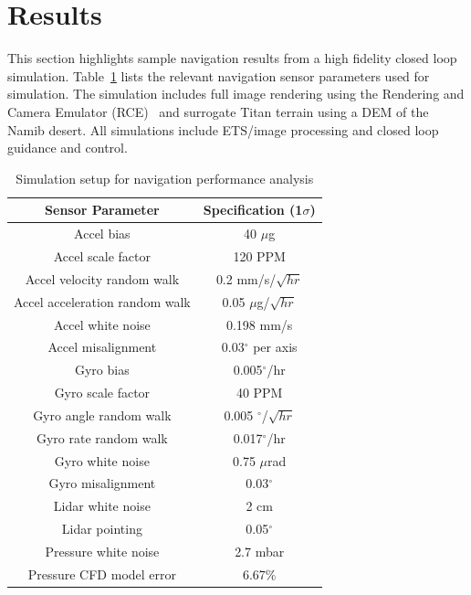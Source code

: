 \section{Results} \label{results}

This section highlights sample navigation results from a high fidelity closed loop simulation. Table~\ref{tab:sim_setup} lists the relevant navigation sensor parameters used for simulation. The simulation includes full image rendering using the Rendering and Camera Emulator (RCE)~\cite{rce} and surrogate Titan terrain using a DEM of the Namib desert.\cite{schilling2019} All simulations include ETS/image processing and closed loop guidance and control.  

\begin{table}[htbp]
	\fontsize{10}{10}\selectfont
    \caption{Simulation setup for navigation performance analysis}
   \label{tab:sim_setup}
        \centering 
   \begin{tabular}{| c | c |} %
      \hline 
      Sensor Parameter & Specification (1$\sigma$)  \\
      \hline 
        Accel bias & 40 $\mu$g \\
        Accel scale factor & 120 PPM \\
        Accel velocity random walk & 0.2 mm/s/$\sqrt{hr}$ \\
        Accel acceleration random walk & 0.05 $\mu$g/$\sqrt{hr}$ \\
        Accel white noise & 0.198 mm/s  \\
        Accel misalignment & 0.03$^\circ$ per axis \\
        Gyro bias & 0.005$^\circ$/hr  \\
        Gyro scale factor & 40 PPM  \\
        Gyro angle random walk & 0.005 $^\circ$/$\sqrt{hr}$  \\
        Gyro rate random walk & 0.017$^\circ$/hr  \\
        Gyro white noise & 0.75 $\mu$rad  \\
        Gyro misalignment & 0.03$^\circ$  \\
        Lidar white noise & 2 cm  \\
        Lidar pointing & 0.05$^\circ$  \\
        Pressure white noise & 2.7 mbar  \\
        Pressure CFD model error & 6.67\%  \\
      \hline
   \end{tabular}
\end{table}

